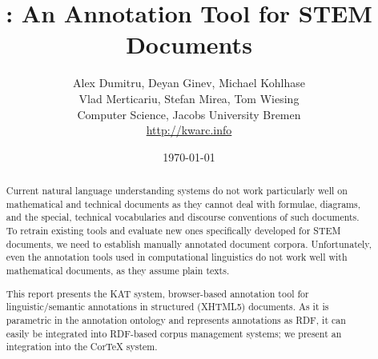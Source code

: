 \documentclass[a4paper, 12pt]{article}
\title{\KAT: An Annotation Tool for STEM Documents}
\author{Alex Dumitru, Deyan Ginev, Michael Kohlhase\\
  Vlad Merticariu, Stefan Mirea, Tom Wiesing\\[1ex]
Computer Science,  Jacobs University Bremen\\
\url{http://kwarc.info}}
\date{\today}
\def\KAT{\textsf{KAT}\xspace}
\begin{document}
\maketitle
\begin{abstract}
  Current natural language understanding systems do not work particularly well on
  mathematical and technical documents as they cannot deal with formulae, diagrams, and
  the special, technical vocabularies and discourse conventions of such documents. To
  retrain existing tools and evaluate new ones specifically developed for STEM documents,
  we need to establish manually annotated document corpora. Unfortunately, even the
  annotation tools used in computational linguistics do not work well with mathematical
  documents, as they assume plain texts.

  This report presents the \KAT system, browser-based annotation tool for
  linguistic/semantic annotations in structured (XHTML5) documents. As it is parametric in
  the annotation ontology and represents annotations as RDF, it can easily be integrated
  into RDF-based corpus management systems; we present an integration into the CorTeX
  system.
\end{abstract}

\thispagestyle{empty} \newpage
\tableofcontents\newpage







\newpage
\printbibliography\newpage
\appendix



\end{document}
